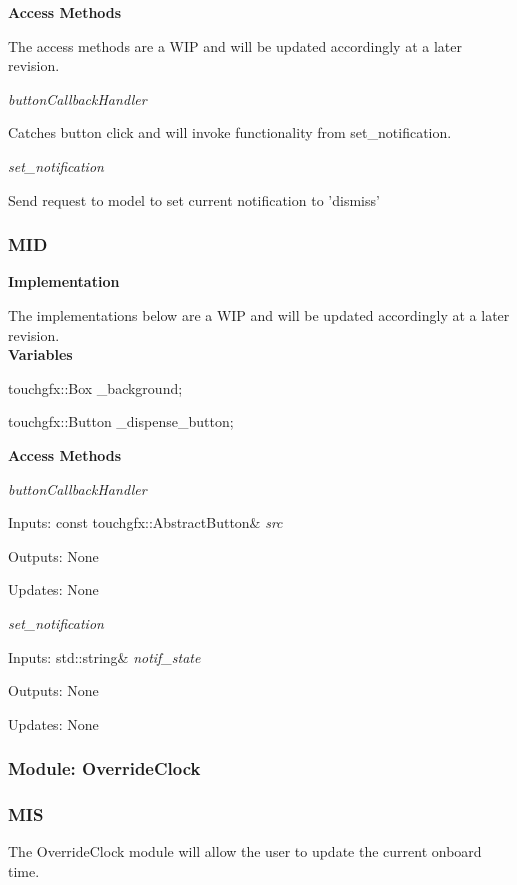 \documentclass[12pt,titlepage]{article}
\begin{document}
\noindent \textbf{Access Methods}

\noindent The access methods are a WIP and will be updated accordingly at a later revision. \par

\textit{buttonCallbackHandler} \par
Catches button click and will invoke functionality from set\_notification.

\textit{set\_notification} \par
Send request to model to set current notification to 'dismiss'

\subsubsection*{MID}

\noindent \textbf{Implementation} 

\noindent The implementations below are a WIP and will be updated accordingly at a later revision.\\

\noindent \textbf{Variables}

touchgfx::Box \_background; \par
touchgfx::Button \_dispense\_button; \newline

\noindent \textbf{Access Methods} 

\textit{buttonCallbackHandler} \par
Inputs: const touchgfx::AbstractButton& \textit{src} \par
Outputs: None \par
Updates: None \newline

\textit{set\_notification} \par
Inputs: std::string& \textit{notif\_state} \par
Outputs: None \par
Updates: None \newline



\subsubsection{Module: OverrideClock}
\subsubsection*{MIS}

\noindent The OverrideClock module will allow the user to update the current onboard time.  \\
\end{document}
